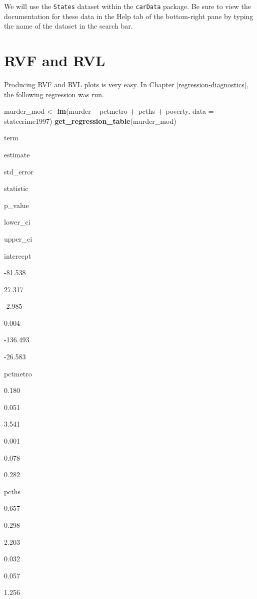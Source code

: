 \documentclass[
]{book}
\newenvironment{Shaded}{\begin{snugshade}}{\end{snugshade}}
\newcommand{\DataTypeTok}[1]{\textcolor[rgb]{0.13,0.29,0.53}{#1}}
\newcommand{\KeywordTok}[1]{\textcolor[rgb]{0.13,0.29,0.53}{\textbf{#1}}}
\newcommand{\NormalTok}[1]{#1}
\newcommand{\OperatorTok}[1]{\textcolor[rgb]{0.81,0.36,0.00}{\textbf{#1}}}
\newcommand{\StringTok}[1]{\textcolor[rgb]{0.31,0.60,0.02}{#1}}
\begin{document}
We will use the \texttt{States} dataset within the \texttt{carData} package. Be sure to view the documentation for these data in the Help tab of the bottom-right pane by typing the name of the dataset in the search bar.

\hypertarget{rvf-and-rvl}{%
\section{RVF and RVL}\label{rvf-and-rvl}}

Producing RVF and RVL plots is very easy. In Chapter \ref{regression-diagnostics}, the following regression was run.

\begin{Shaded}
\begin{Highlighting}[]
\NormalTok{murder_mod <-}\StringTok{ }\KeywordTok{lm}\NormalTok{(murder }\OperatorTok{~}\StringTok{ }\NormalTok{pctmetro }\OperatorTok{+}\StringTok{ }\NormalTok{pcths }\OperatorTok{+}\StringTok{ }\NormalTok{poverty, }\DataTypeTok{data =}\NormalTok{ statecrime1997)}
\KeywordTok{get_regression_table}\NormalTok{(murder_mod)}
\end{Highlighting}
\end{Shaded}

term

estimate

std\_error

statistic

p\_value

lower\_ci

upper\_ci

intercept

-81.538

27.317

-2.985

0.004

-136.493

-26.583

pctmetro

0.180

0.051

3.541

0.001

0.078

0.282

pcths

0.657

0.298

2.203

0.032

0.057

1.256
\end{document}
